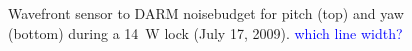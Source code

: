 \begin{figure}
\begin{centering}
\caption[]{Wavefront sensor to DARM noisebudget for pitch (top) and
  yaw (bottom) during a 14~W lock (July 17, 2009). \textcolor{blue}{which line width?}}
\label{fig:}
\end{centering}
\end{figure}

